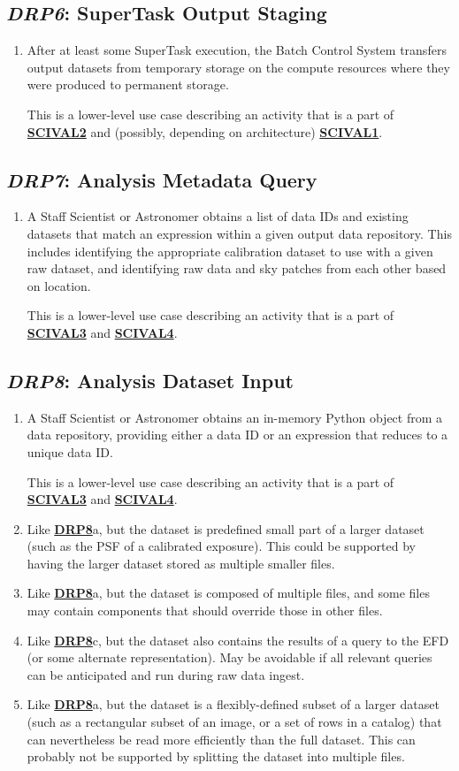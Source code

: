 \documentclass[DM,toc,lsstdraft]{lsstdoc}
\newcommand{\usecase}[3]{%
\subsection{\emph{#1}: #2}
\label{use:#1}
\begin{enumerate}[label=\alph*.]
#3
\end{enumerate}
}
\newcommand{\useref}[1]{\hyperref[use:#1]{\textcolor{lsstblue}{\textbf{#1}}}}
\begin{document}
\usecase{DRP6}{SuperTask Output Staging}{%

\item
After at least some SuperTask execution, the Batch Control System transfers output datasets from temporary storage on the compute resources where they were produced to permanent storage.

This is a lower-level use case describing an activity that is a part of \useref{SCIVAL2} and (possibly, depending on architecture) \useref{SCIVAL1}.

}

\usecase{DRP7}{Analysis Metadata Query}{%

\item
A Staff Scientist or Astronomer obtains a list of data IDs and existing datasets that match an expression within a given output data repository.
This includes identifying the appropriate calibration dataset to use with a given raw dataset, and identifying raw data and sky patches from each other based on location.

This is a lower-level use case describing an activity that is a part of \useref{SCIVAL3} and \useref{SCIVAL4}.
}

\usecase{DRP8}{Analysis Dataset Input}{%

\item
A Staff Scientist or Astronomer obtains an in-memory Python object from a data repository, providing either a data ID or an expression that reduces to a unique data ID.

This is a lower-level use case describing an activity that is a part of \useref{SCIVAL3} and \useref{SCIVAL4}.

\item
Like \useref{DRP8}a, but the dataset is predefined small part of a larger dataset (such as the PSF of a calibrated exposure).
This could be supported by having the larger dataset stored as multiple smaller files.

\item
Like \useref{DRP8}a, but the dataset is composed of multiple files, and some files may contain components that should override those in other files.

\item
Like \useref{DRP8}c, but the dataset also contains the results of a query to the EFD (or some alternate representation).
May be avoidable if all relevant queries can be anticipated and run during raw data ingest.

\item
Like \useref{DRP8}a, but the dataset is a flexibly-defined subset of a larger dataset (such as a rectangular subset of an image, or a set of rows in a catalog) that can nevertheless be read more efficiently than the full dataset.
This can probably not be supported by splitting the dataset into multiple files.
}
\end{document}

